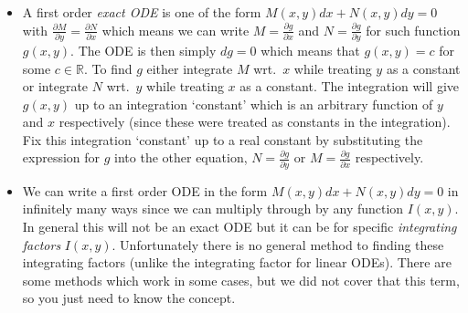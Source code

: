 \begin{itemize}
\item A first order \emph{exact ODE} is one of the form $M(x,y) dx + N(x,y) dy = 0$ with $\frac{\partial M}{\partial y} = \frac{\partial N}{\partial x}$ which means we can write $M = \frac{\partial g}{\partial x}$ and $N = \frac{\partial g}{\partial y}$ for such function $g(x,y)$. The ODE is then simply $dg = 0$ which means that $g(x,y) = c$ for some $c \in \mathbb{R}$. To find $g$ either integrate $M$ wrt.\ $x$ while treating $y$ as a constant or integrate $N$ wrt.\ $y$ while treating $x$ as a constant. The integration will give $g(x,y)$ up to an integration `constant' which is an arbitrary function of $y$ and $x$ respectively (since these were treated as constants in the integration). Fix this integration `constant' up to a real constant by substituting the expression for $g$ into the other equation, $N = \frac{\partial g}{\partial y}$ or $M = \frac{\partial g}{\partial x}$ respectively.

\item We can write a first order ODE in the form $M(x,y) dx + N(x,y) dy = 0$ in infinitely many ways since we can multiply through by any function $I(x,y)$. In general this will not be an exact ODE but it can be for specific \emph{integrating factors} $I(x,y)$. Unfortunately there is no general method to finding these integrating factors (unlike the integrating factor for linear ODEs). There are some methods which work in some cases, but we did not cover that this term, so you just need to know the concept.

\end{itemize}

\newpage

